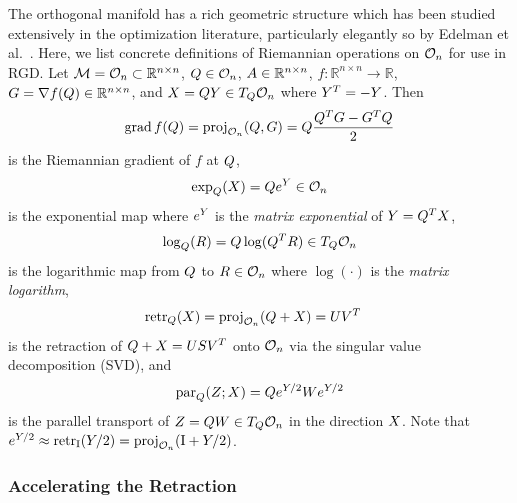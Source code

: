 The orthogonal manifold has a rich geometric structure which has been studied extensively in the optimization literature, particularly elegantly so by Edelman et al.~\citep{edelman_geometry_1998}.
Here, we list concrete definitions of Riemannian operations on $\mathcal{O}_{n}$ for use in \gls*{RGD}.
Let $\mathcal{M} = \mathcal{O}_{n} \subset \mathbb{R}^{n \times n}$,
$Q \in \mathcal{O}_{n}$,
$A \in \mathbb{R}^{n \times n}$,
$f : \mathbb{R}^{n \times n} \to \mathbb{R}$,
$G = \nabla f(Q) \in \mathbb{R}^{n \times n}$,
and $X = Q Y \in T_{Q} \mathcal{O}_{n}$ where $Y^T = -Y$.
Then~\citep{edelman_geometry_1998}
\begin{align*}
    \grad{f(\vv{Q})} = \Proj{\Ortho{n}}{ \vv{Q}, \vv{G} } = \vv{Q} \frac{\vv{Q}^T \vv{G} - \vv{G}^T \vv{Q}}{2}
\end{align*}
is the Riemannian gradient of $f$ at $Q$,
\begin{align*}
    \exp_{Q}(X) = Q e^{Y} \in \mathcal{O}_{n}
\end{align*}
is the exponential map where $e^{Y}$ is the \textit{matrix exponential} of $Y = Q^T X$,
\begin{align*}
    \log_{Q}(R) = Q \log( Q^T R ) \in T_{Q} \mathcal{O}_{n}
\end{align*}
is the logarithmic map from $Q$ to $R \in \mathcal{O}_{n}$ where $\log( \cdot )$ is the \textit{matrix logarithm},
\begin{align}\label{eqn:apx:ortho_svd_retraction}
    \Retr{\vv{Q}}{ \vv{X} } & = \Proj{\Ortho{n}}{ \vv{Q} + \vv{X} } = \vv{U} \vv{V}^T
\end{align}
is the retraction of $Q + X = U S V^T$ onto $\mathcal{O}_{n}$ via the singular value decomposition (\gls*{SVD}), and
\begin{align}
    \operatorname{par}_{Q}(Z; X) = Q e^{Y/2} W e^{Y/2}
\end{align}
is the parallel transport of $Z = Q W \in T_{Q} \mathcal{O}_{n}$ in the direction $X$.
Note that $e^{\vv{Y}/2} \approx \Retr{\Id}{ \vv{Y}/2 } = \Proj{\Ortho{n}}{ \Id + \vv{Y}/2 }$.

\subsubsection{Accelerating the Retraction}

